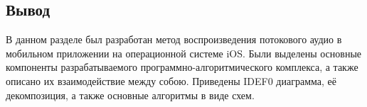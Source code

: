     \subsection*{Вывод}
        \par В данном разделе был разработан метод воспроизведения потокового аудио в мобильном приложении на операционной системе iOS. 
        Были выделены основные компоненты разрабатываемого программно-алгоритмического комплекса, а также описано их взаимодействие между собою. 
        Приведены IDEF0 диаграмма, её декомпозиция, а также основные алгоритмы в виде схем.
\pagebreak